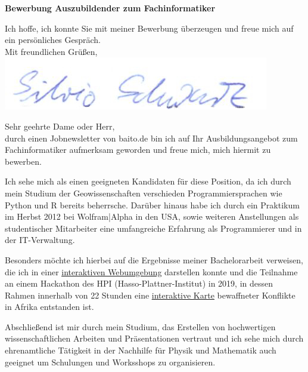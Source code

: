 \documentclass[11pt,a4paper,roman]{moderncv}
\begin{document}
\recipient{~}{ }
\date{\today}
\opening{\textbf{Bewerbung Auszubildender zum Fachinformatiker}}
\closing{Ich hoffe, ich konnte Sie mit meiner Bewerbung überzeugen und freue mich auf ein persönliches Gespräch.\\
\vspace{1cm}
Mit freundlichen Grüßen,\\ \vspace{0.2cm}
\includegraphics[scale=0.4]{../../img/Unterschrift_Silvio} \vspace{-1cm}
}
\makelettertitle

Sehr geehrte Dame oder Herr,\\
durch einen Jobnewsletter von baito.de bin ich auf Ihr Ausbildungsangebot zum Fachinformatiker aufmerksam geworden und freue mich, mich hiermit zu bewerben.

Ich sehe mich als einen geeigneten Kandidaten für diese Position, da ich durch mein Studium der Geowissenschaften verschieden Programmiersprachen wie Python und R bereits beherrsche. Darüber hinaus habe ich durch ein Praktikum im Herbst 2012 bei Wolfram|Alpha in den USA, sowie weiteren Anstellungen als studentischer Mitarbeiter eine umfangreiche Erfahrung als Programmierer und in der IT-Verwaltung.

Besonders möchte ich hierbei auf die Ergebnisse meiner Bachelorarbeit verweisen, die ich in einer \href{https://earthquake-distances.herokuapp.com/}{\color{pblue}\underline{interaktiven Webumgebung}} darstellen konnte und die Teilnahme an einem Hackathon des HPI (Hasso-Plattner-Institut) in 2019, in dessen Rahmen innerhalb von 22 Stunden eine \href{https://earthquake-distances.herokuapp.com}{\color{pblue}\underline{interaktive Karte}} bewaffneter Konflikte in Afrika entstanden ist.

Abschließend ist mir durch mein Studium, das Erstellen von hochwertigen wissenschaftlichen Arbeiten und Präsentationen vertraut und ich sehe mich durch  ehrenamtliche Tätigkeit in der Nachhilfe für Physik und Mathematik auch geeignet um Schulungen und Worksshops zu organisieren.\\

\vspace{1cm}


\makeletterclosing
\end{document}
